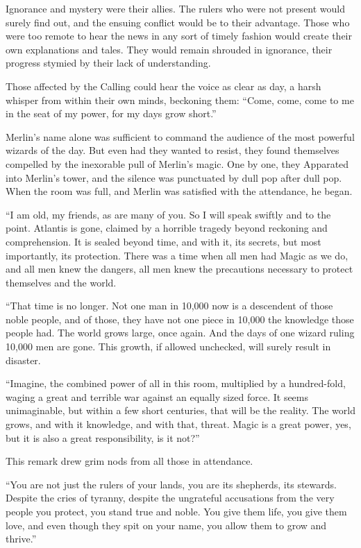 Ignorance and mystery were their allies. The rulers who were not present would surely find out, and the ensuing conflict would be to their advantage. Those who were too remote to hear the news in any sort of timely fashion would create their own explanations and tales. They would remain shrouded in ignorance, their progress stymied by their lack of understanding.

Those affected by the Calling could hear the voice as clear as day, a harsh whisper from within their own minds, beckoning them: “Come, come, come to me in the seat of my power, for my days grow short.”

Merlin’s name alone was sufficient to command the audience of the most powerful wizards of the day. But even had they wanted to resist, they found themselves compelled by the inexorable pull of Merlin’s magic. One by one, they Apparated into Merlin’s tower, and the silence was punctuated by dull pop after dull pop. When the room was full, and Merlin was satisfied with the attendance, he began.

“I am old, my friends, as are many of you. So I will speak swiftly and to the point. Atlantis is gone, claimed by a horrible tragedy beyond reckoning and comprehension. It is sealed beyond time, and with it, its secrets, but most importantly, its protection. There was a time when all men had Magic as we do, and all men knew the dangers, all men knew the precautions necessary to protect themselves and the world.

“That time is no longer. Not one man in 10,000 now is a descendent of those noble people, and of those, they have not one piece in 10,000 the knowledge those people had. The world grows large, once again. And the days of one wizard ruling 10,000 men are gone. This growth, if allowed unchecked, will surely result in disaster.

“Imagine, the combined power of all in this room, multiplied by a hundred-fold, waging a great and terrible war against an equally sized force. It seems unimaginable, but within a few short centuries, that will be the reality. The world grows, and with it knowledge, and with that, threat. Magic is a great power, yes, but it is also a great responsibility, is it not?”

This remark drew grim nods from all those in attendance.

“You are not just the rulers of your lands, you are its shepherds, its stewards. Despite the cries of tyranny, despite the ungrateful accusations from the very people you protect, you stand true and noble. You give them life, you give them love, and even though they spit on your name, you allow them to grow and thrive.”

